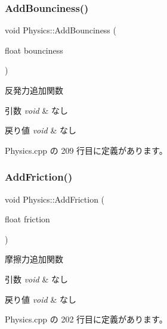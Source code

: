 \subsubsection{\texorpdfstring{Add\+Bounciness()}{AddBounciness()}}
{\footnotesize\ttfamily void Physics\+::\+Add\+Bounciness (\begin{DoxyParamCaption}\item[{float}]{bounciness }\end{DoxyParamCaption})}



反発力追加関数 


\begin{DoxyParams}{引数}
{\em void} & なし \\
\hline
\end{DoxyParams}

\begin{DoxyRetVals}{戻り値}
{\em void} & なし \\
\hline
\end{DoxyRetVals}


 Physics.\+cpp の 209 行目に定義があります。

\mbox{\label{class_physics_a77e9a04f034ccad4fec996832fb7ce63}} 
\subsubsection{\texorpdfstring{Add\+Friction()}{AddFriction()}}
{\footnotesize\ttfamily void Physics\+::\+Add\+Friction (\begin{DoxyParamCaption}\item[{float}]{friction }\end{DoxyParamCaption})}



摩擦力追加関数 


\begin{DoxyParams}{引数}
{\em void} & なし \\
\hline
\end{DoxyParams}

\begin{DoxyRetVals}{戻り値}
{\em void} & なし \\
\hline
\end{DoxyRetVals}


 Physics.\+cpp の 202 行目に定義があります。

\mbox{\label{class_physics_a5fb75ffa48210f4e01ab5a199626a3d5}} 
